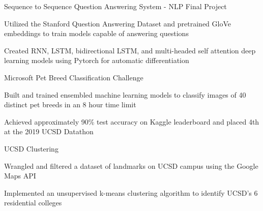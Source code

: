 
\begin{cventries}
\cventry
    {} %
    {Sequence to Sequence Question Answering System - NLP Final Project} %
    {} %
    {} %
    {
      \begin{cvitems} %
        \item {Utilized the Stanford Question Answering Dataset and pretrained GloVe embeddings to train models capable of answering questions}
		\item {Created RNN, LSTM, bidirectional LSTM, and multi-headed self attention deep learning models using Pytorch for automatic differentiation}
      \end{cvitems}
    }
    
  \cventry
    {} %
    {Microsoft Pet Breed Classification Challenge} %
    {} %
    {} %
    {
      \begin{cvitems} %
        \item {Built and trained ensembled machine learning models to classify images of 40 distinct pet breeds in an 8 hour time limit}
		\item {Achieved approximately 90\% test accuracy on Kaggle leaderboard and placed 4th at the 2019 UCSD Datathon}
      \end{cvitems}
    }

  \cventry
    {} %
    {UCSD Clustering} %
    {} %
    {} %
    {
      \begin{cvitems} %
      	\item {Wrangled and filtered a dataset of landmarks on UCSD campus using the Google Maps API}
		\item {Implemented an unsupervised k-means clustering algorithm to identify UCSD’s 6 residential colleges}
      \end{cvitems}
    }
\end{cventries}